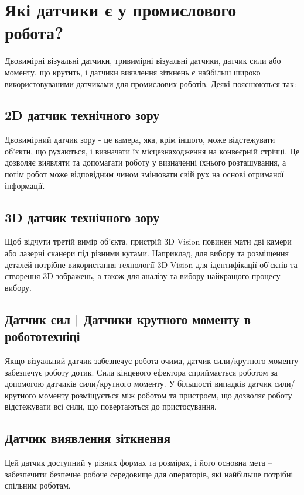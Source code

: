 \documentclass[a4paper,14pt]{extreport}
\begin{document}
\section{Які датчики є у промислового робота?}\par

Двовимірні візуальні датчики, тривимірні візуальні датчики, датчик сили або моменту, що крутить, і датчики виявлення зіткнень є найбільш широко використовуваними датчиками для промислових роботів. Деякі  пояснюються так:

  \subsection{2D датчик технічного зору}
Двовимірний датчик зору - це камера, яка, крім іншого, може відстежувати об'єкти, що рухаються, і визначати їх місцезнаходження на конвеєрній стрічці. Це дозволяє виявляти та допомагати роботу у визначенні їхнього розташування, а потім робот може відповідним чином змінювати свій рух на основі отриманої інформації.

  \subsection{3D датчик технічного зору}
Щоб відчути третій вимір об'єкта, пристрій 3D Vision повинен мати дві камери або лазерні сканери під різними кутами. Наприклад, для вибору та розміщення деталей потрібне використання технології 3D Vision для ідентифікації об'єктів та створення 3D-зображень, а також для аналізу та вибору найкращого процесу вибору.

  \subsection{Датчик сил | Датчики крутного моменту в робототехніці}
Якщо візуальний датчик забезпечує робота очима, датчик сили/крутного моменту забезпечує роботу дотик. Сила кінцевого ефектора сприймається роботом за допомогою датчиків сили/крутного моменту. У більшості випадків датчик сили/крутного моменту розміщується між роботом та пристроєм, що дозволяє роботу відстежувати всі сили, що повертаються до пристосування.

  \subsection{Датчик виявлення зіткнення}
Цей датчик доступний у різних формах та розмірах, і його основна мета – забезпечити безпечне робоче середовище для операторів, які найбільше потрібні спільним роботам.
\end{document}
